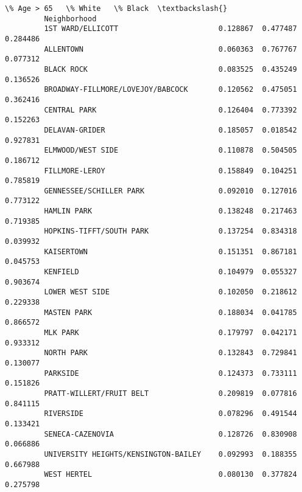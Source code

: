 \documentclass[11pt]{article}
\begin{document}
\begin{Verbatim}[commandchars=\\\{\}]
                                               \% Age > 65   \% White   \% Black  \textbackslash{}
         Neighborhood                                                           
         1ST WARD/ELLICOTT                       0.128867  0.477487  0.284486   
         ALLENTOWN                               0.060363  0.767767  0.077312   
         BLACK ROCK                              0.083525  0.435249  0.136526   
         BROADWAY-FILLMORE/LOVEJOY/BABCOCK       0.120562  0.475051  0.362416   
         CENTRAL PARK                            0.126404  0.773392  0.152263   
         DELAVAN-GRIDER                          0.185057  0.018542  0.927831   
         ELMWOOD/WEST SIDE                       0.110878  0.504505  0.186712   
         FILLMORE-LEROY                          0.158849  0.104251  0.785819   
         GENNESSEE/SCHILLER PARK                 0.092010  0.127016  0.773122   
         HAMLIN PARK                             0.138248  0.217463  0.719385   
         HOPKINS-TIFFT/SOUTH PARK                0.137254  0.834318  0.039932   
         KAISERTOWN                              0.151351  0.867181  0.045753   
         KENFIELD                                0.104979  0.055327  0.903674   
         LOWER WEST SIDE                         0.102050  0.218612  0.229338   
         MASTEN PARK                             0.188034  0.041785  0.866572   
         MLK PARK                                0.179797  0.042171  0.933312   
         NORTH PARK                              0.132843  0.729841  0.130077   
         PARKSIDE                                0.124373  0.733111  0.151826   
         PRATT-WILLERT/FRUIT BELT                0.209819  0.077816  0.841115   
         RIVERSIDE                               0.078296  0.491544  0.133421   
         SENECA-CAZENOVIA                        0.128726  0.830908  0.066886   
         UNIVERSITY HEIGHTS/KENSINGTON-BAILEY    0.092993  0.188355  0.667988   
         WEST HERTEL                             0.080130  0.377824  0.275798   
         

\end{Verbatim}
\end{document}
